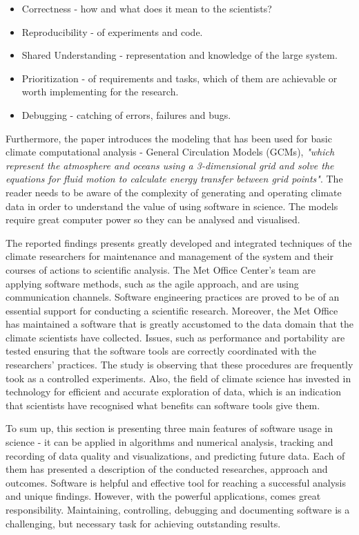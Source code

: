\begin{itemize}
\item Correctness - how and what does it mean to the scientists? 
\item Reproducibility - of experiments and code. 
\item Shared Understanding - representation and knowledge of the large system. 
\item Prioritization - of requirements and tasks, which of them are achievable or worth implementing for the research. 
\item Debugging - catching of errors, failures and bugs.
\end{itemize}

Furthermore, the paper introduces the modeling that has been used for basic climate computational analysis - General Circulation Models (GCMs), \textit{"which represent the atmosphere and oceans using a 3-dimensional grid and solve the equations for fluid motion to calculate energy transfer between grid points"}. \cite{easterbrook2009engineering} The reader needs to be aware of the complexity of generating and operating climate data in order to understand the value of using software in science. The models require great computer power so they can be analysed and visualised.

The reported findings presents greatly developed and integrated techniques of the climate researchers for maintenance and management of the system and their courses of actions to scientific analysis. The Met Office Center's team are applying software methods, such as the agile approach, and are using communication channels. Software engineering practices are proved to be of an essential support for conducting a scientific research. Moreover, the Met Office has maintained a software that is greatly accustomed to the data domain that the climate scientists have collected. Issues, such as performance and portability are tested ensuring that the software tools are correctly coordinated with the researchers' practices. The study is observing that these procedures are frequently took as a controlled experiments. Also, the field of climate science has invested in technology for efficient and accurate exploration of data, which is an indication that scientists have recognised what benefits can software tools give them. \cite{easterbrook2009engineering}

To sum up, this section is presenting three main features of software usage in science - it can be applied in algorithms and numerical analysis, tracking and recording of data quality and visualizations, and predicting future data. Each of them has presented a description of the conducted researches, approach and outcomes. Software is helpful and effective tool for reaching a successful analysis and unique findings. However, with the powerful applications, comes great responsibility. Maintaining, controlling, debugging and documenting software is a challenging, but necessary task for achieving outstanding results. 

